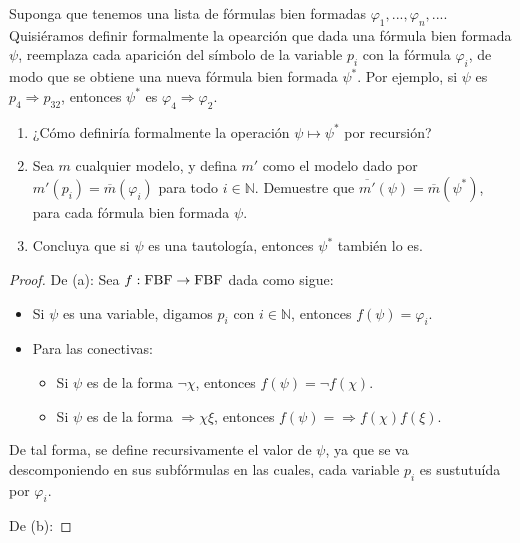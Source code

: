 \documentclass[12pt]{report}
\newcounter{it}
\theoremstyle{largebreak}
\newcommand\cf[3]{\ensuremath{#1:#2\rightarrow#3}}
\begin{document}
    \begin{excer}
        Suponga que tenemos una lista de fórmulas bien formadas $\varphi_1,...,\varphi_n,...$. Quisiéramos definir formalmente la opearción que dada una fórmula bien formada $\psi$, reemplaza cada aparición del símbolo de la variable $p_i$ con la fórmula $\varphi_i$, de modo que se obtiene una nueva fórmula bien formada $\psi^*$. Por ejemplo, si $\psi$ es $p_4\Rightarrow p_{ 32}$, entonces $\psi^*$ es $\varphi_4\Rightarrow\varphi_{ 2}$.
        \begin{enumerate}
            \item ¿Cómo definiría formalmente la operación $\psi\mapsto\psi^*$ por recursión?
            \item Sea $m$ cualquier modelo, y defina $m'$ como el modelo dado por $m'(p_i)=\overline{m}(\varphi_i)$ para todo $i\in\mathbb{N}$. Demuestre que $\overline{m'}(\psi)=\overline{m}(\psi^*)$, para cada fórmula bien formada $\psi$.
            \item Concluya que si $\psi$ es una tautología, entonces $\psi^*$ también lo es.
        \end{enumerate}
    \end{excer}

    \begin{proof}
        De (a): Sea $\cf{f}{\textup{FBF}}{\textup{FBF}}$ dada como sigue:
        \begin{itemize}
            \item Si $\psi$ es una variable, digamos $p_i$ con $i\in\mathbb{N}$, entonces $f(\psi)=\varphi_i$.
            \item Para las conectivas:
            \begin{itemize}
                \item Si $\psi$ es de la forma $\neg\chi$, entonces $f(\psi)=\neg f(\chi)$.
                \item Si $\psi$ es de la forma $\Rightarrow\chi\xi$, entonces $f(\psi)=\Rightarrow f(\chi)f(\xi)$.
            \end{itemize}
        \end{itemize}
        De tal forma, se define recursivamente el valor de $\psi$, ya que se va descomponiendo en sus subfórmulas en las cuales, cada variable $p_i$ es sustutuída por $\varphi_i$.

        De (b): %
    \end{proof}
\end{document}
